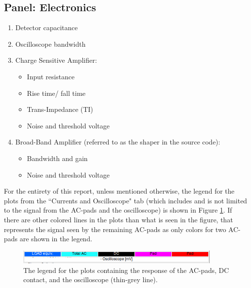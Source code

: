 \documentclass[11pt]{article}
\begin{document}
\subsection{Panel: Electronics}
\begin{enumerate}
    \item Detector capacitance
    \item Oscilloscope bandwidth
    \item Charge Sensitive Amplifier:
    \begin{itemize}
        \item Input resistance
        \item Rise time/ fall time
        \item Trans-Impedance (TI)
        \item Noise and threshold voltage
    \end{itemize}
    \item Broad-Band Amplifier (referred to as the shaper in the source code):
    \begin{itemize}
        \item Bandwidth and gain
        \item Noise and threshold voltage
    \end{itemize}
\end{enumerate}
For the entirety of this report, unless mentioned otherwise, the legend for the plots from the ``Currents and Oscilloscope" tab (which includes and is not limited to the signal from the AC-pads and the oscilloscope) is shown in Figure \ref{fig:wf2-legend}. If there are other colored lines in the plots than what is seen in the figure, that represents the signal seen by the remaining AC-pads as only colors for two AC-pads are shown in the legend.

\begin{figure}[h]
    \centering
    \includegraphics[width=4in]{Images/Legend.png}
    \caption{The legend for the plots containing the response of the AC-pads, DC contact, and the oscilloscope (thin-grey line).}
    \label{fig:wf2-legend}
\end{figure}
\end{document}
